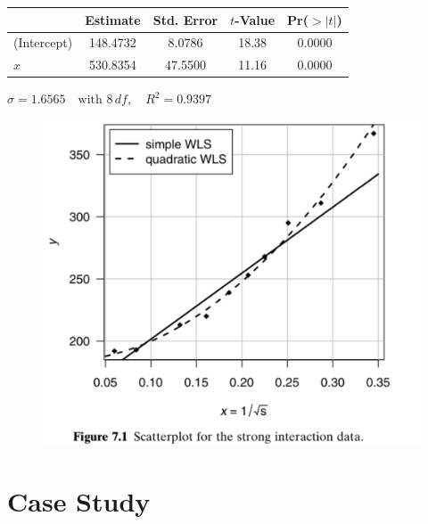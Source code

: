 \documentclass[14pt]{extarticle}
\begin{document}
\begin{table}[h!]
\centering
{}
\begin{tabular}{lcccc}
\hline
    & \quad Estimate \quad & \quad Std. Error \quad & $t$-Value & Pr($>|t|$) \\
\hline
(Intercept) & 148.4732 & 8.0786 & 18.38 & 0.0000 \\
$x$ & 530.8354 & 47.5500 & 11.16 & 0.0000 \\
\hline
\end{tabular}
$\hat{\sigma} = 1.6565 \quad \text{with } 8 \, df, \quad R^2 = 0.9397$
\end{table}
\begin{figure}[H]
    \centering
    \includegraphics[width=1\textwidth]{fig1.png}
\end{figure}

\section*{Case Study}
\end{document}
